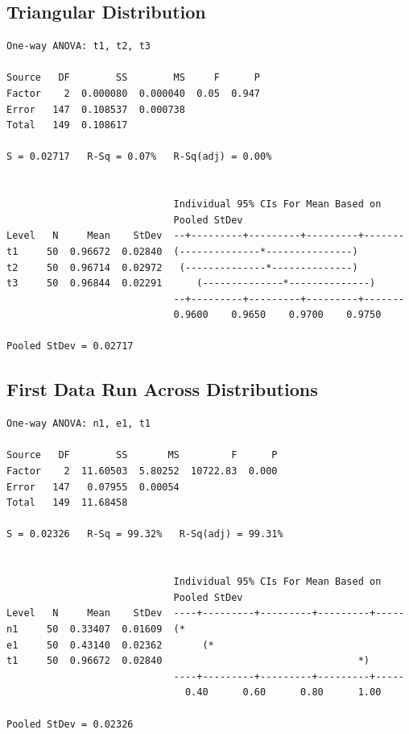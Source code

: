 \documentclass[letterpaper,10pt]{article}
\begin{document}
\subsection{Triangular Distribution}
\begin{samepage}
\begin{verbatim}
One-way ANOVA: t1, t2, t3 

Source   DF        SS        MS     F      P
Factor    2  0.000080  0.000040  0.05  0.947
Error   147  0.108537  0.000738
Total   149  0.108617

S = 0.02717   R-Sq = 0.07%   R-Sq(adj) = 0.00%


                             Individual 95% CIs For Mean Based on
                             Pooled StDev
Level   N     Mean    StDev  --+---------+---------+---------+-------
t1     50  0.96672  0.02840  (--------------*---------------)
t2     50  0.96714  0.02972   (--------------*--------------)
t3     50  0.96844  0.02291      (--------------*--------------)
                             --+---------+---------+---------+-------
                             0.9600    0.9650    0.9700    0.9750

Pooled StDev = 0.02717
\end{verbatim}
\end{samepage}
\subsection{First Data Run Across Distributions}
\begin{samepage}
\begin{verbatim}
One-way ANOVA: n1, e1, t1 

Source   DF        SS       MS         F      P
Factor    2  11.60503  5.80252  10722.83  0.000
Error   147   0.07955  0.00054
Total   149  11.68458

S = 0.02326   R-Sq = 99.32%   R-Sq(adj) = 99.31%


                             Individual 95% CIs For Mean Based on
                             Pooled StDev
Level   N     Mean    StDev  ----+---------+---------+---------+-----
n1     50  0.33407  0.01609  (*
e1     50  0.43140  0.02362       (*
t1     50  0.96672  0.02840                                  *)
                             ----+---------+---------+---------+-----
                               0.40      0.60      0.80      1.00

Pooled StDev = 0.02326
\end{verbatim}
\end{samepage}
\end{document}
